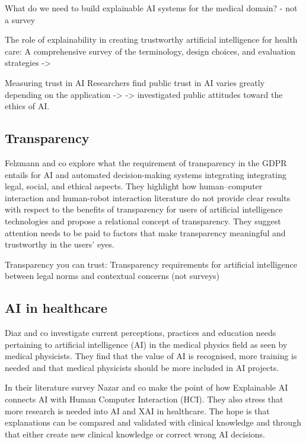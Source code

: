 \documentclass[manuscript,screen,review]{acmart}
\begin{document}
What do we need to build explainable AI systems for the medical domain?  - not a survey

The role of explainability in creating trustworthy artificial intelligence for health care: A comprehensive survey of the terminology, design choices, and evaluation strategies -> 

Measuring trust in AI
Researchers find public trust in AI varies greatly depending on the application -> %
-> investigated public attitudes toward the ethics of AI.

\subsection{Transparency}\label{subsec:transparency}
Felzmann and co explore what the requirement of transparency in the GDPR entails for AI and automated decision-making systems integrating integrating legal, social, and ethical aspects.
They highlight how human–computer interaction and human-robot interaction literature do not provide clear results with respect to the benefits of transparency for users of artificial intelligence technologies
and propose a relational concept of transparency. They suggest attention needs to be paid to factors that make transparency meaningful and trustworthy in the users’ eyes.\cite{Felzmann2019}

Transparency you can trust: Transparency requirements for artificial intelligence between legal norms and contextual concerns (not surveys)\cite{Markus2021}

\subsection{AI in healthcare}\label{subsec:ai-in-healthcare}
Diaz and co investigate current perceptions, practices and education needs pertaining to artificial intelligence (AI) in the medical physics field as seen by medical physicists.
They find that the value of AI is recognised, more training is needed and that medical physicists should be more included in AI projects.\cite{Diaz2021}

In their literature survey Nazar and co make the point of how Explainable AI connects AI with Human Computer Interaction (HCI).
They also stress that more research is needed into AI and XAI in healthcare.
The hope is that explanations can be compared and validated with clinical knowledge and through that either create new
clinical knowledge or correct wrong AI decisions.\cite{Nazar2021}
\end{document}
